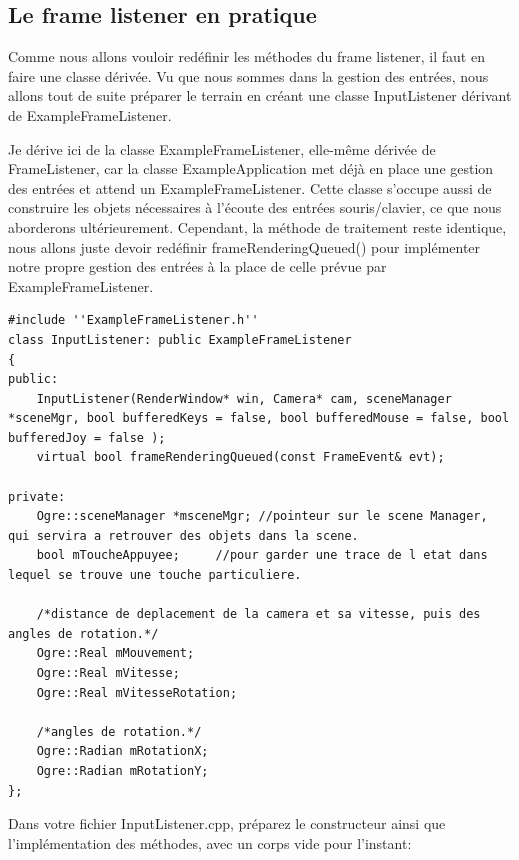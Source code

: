 \documentclass[10pt,a4paper]{report}
\begin{document}
\subsection{Le frame listener en pratique}

Comme nous allons vouloir red\'efinir les m\'ethodes du frame listener, il faut en faire une classe d\'eriv\'ee. Vu que nous sommes dans la gestion des entr\'ees, nous allons tout de suite pr\'eparer le terrain en cr\'eant une classe InputListener d\'erivant de ExampleFrameListener.

Je d\'erive ici de la classe ExampleFrameListener, elle-m\^eme d\'eriv\'ee de FrameListener, car la classe ExampleApplication met d\'ej\`{a} en place une gestion des entr\'ees et attend un ExampleFrameListener. Cette classe s'occupe aussi de construire les objets n\'ecessaires \`{a} l'\'ecoute des entr\'ees souris/clavier, ce que nous aborderons ult\'erieurement.
Cependant, la m\'ethode de traitement reste identique, nous allons juste devoir red\'efinir frameRenderingQueued() pour impl\'ementer notre propre gestion des entr\'ees \`{a} la place de celle pr\'evue par ExampleFrameListener.


\begin{lstlisting}[caption={ExampleFrameListener.cpp}]
#include ''ExampleFrameListener.h''
class InputListener: public ExampleFrameListener
{
public:
    InputListener(RenderWindow* win, Camera* cam, sceneManager *sceneMgr, bool bufferedKeys = false, bool bufferedMouse = false, bool bufferedJoy = false );
    virtual bool frameRenderingQueued(const FrameEvent& evt);

private:
    Ogre::sceneManager *msceneMgr; //pointeur sur le scene Manager, qui servira a retrouver des objets dans la scene.
    bool mToucheAppuyee;	 //pour garder une trace de l etat dans lequel se trouve une touche particuliere.

    /*distance de deplacement de la camera et sa vitesse, puis des angles de rotation.*/
    Ogre::Real mMouvement;
    Ogre::Real mVitesse;
    Ogre::Real mVitesseRotation;

	/*angles de rotation.*/
    Ogre::Radian mRotationX;
    Ogre::Radian mRotationY;
};
\end{lstlisting}



Dans votre fichier InputListener.cpp, pr\'eparez le constructeur ainsi que l'impl\'ementation des m\'ethodes, avec un corps vide pour l'instant:
\end{document}
